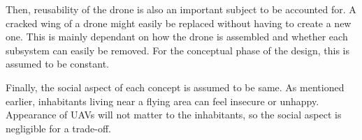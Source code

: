Then, reusability of the drone is also an important subject to be accounted for. A cracked wing of a drone might easily be replaced without having to create a new one. This is mainly dependant on how the drone is assembled and whether each subsystem can easily be removed. For the conceptual phase of the design, this is assumed to be constant. 

Finally, the social aspect of each concept is assumed to be same. As mentioned earlier, inhabitants living near a flying area can feel insecure or unhappy. Appearance of UAVs will not matter to the inhabitants, so the social aspect is negligible for a trade-off.
 








